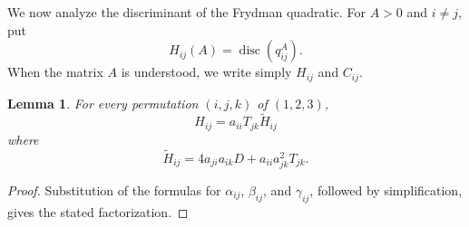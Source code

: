 \documentclass[11pt,onecolumn]{amsart}
\theoremstyle{plain}
\newtheorem{lemma}[theorem]{Lemma}
\theoremstyle{definition}
\theoremstyle{remark}
\begin{document}
We now analyze the discriminant of the Frydman quadratic.  For
$A>0$ and $i\neq j$, put
\[
H_{ij}(A)=\operatorname{disc}(q_{ij}^A).
\]
When the matrix $A$ is understood, we write simply $H_{ij}$ and
$C_{ij}$.



\begin{lemma}
\label{lem:Frydman-discriminant-factorization}
For every permutation $(i,j,k)$ of $(1,2,3)$,
\[
H_{ij}=a_{ii}T_{jk}\widetilde H_{ij}
\]
where
\[
\widetilde H_{ij}=4a_{ji}a_{ik}D+a_{ii}a_{jk}^2T_{jk}.
\]
\end{lemma}

\begin{proof}
Substitution of the formulas for $\alpha_{ij}$, $\beta_{ij}$, and
$\gamma_{ij}$, followed by simplification, gives the stated
factorization.
\end{proof}
\end{document}
